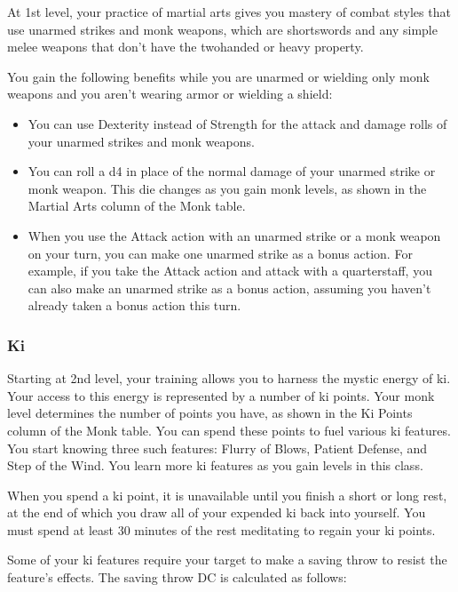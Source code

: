 \documentclass[
]{article}
\providecommand{\tightlist}{%
  \setlength{\itemsep}{0pt}\setlength{\parskip}{0pt}}
\begin{document}
At 1st level, your practice of martial arts gives you mastery of combat
styles that use unarmed strikes and monk weapons, which are shortswords
and any simple melee weapons that don't have the twohanded or heavy
property.

You gain the following benefits while you are unarmed or wielding only
monk weapons and you aren't wearing armor or wielding a shield:

\begin{itemize}
\tightlist
\item
  You can use Dexterity instead of Strength for the attack and damage
  rolls of your unarmed strikes and monk weapons.
\item
  You can roll a d4 in place of the normal damage of your unarmed strike
  or monk weapon. This die changes as you gain monk levels, as shown in
  the Martial Arts column of the Monk table.
\item
  When you use the Attack action with an unarmed strike or a monk weapon
  on your turn, you can make one unarmed strike as a bonus action. For
  example, if you take the Attack action and attack with a quarterstaff,
  you can also make an unarmed strike as a bonus action, assuming you
  haven't already taken a bonus action this turn.
\end{itemize}

\hypertarget{ki}{%
\subsubsection{Ki}\label{ki}}

Starting at 2nd level, your training allows you to harness the mystic
energy of ki. Your access to this energy is represented by a number of
ki points. Your monk level determines the number of points you have, as
shown in the Ki Points column of the Monk table. You can spend these
points to fuel various ki features. You start knowing three such
features: Flurry of Blows, Patient Defense, and Step of the Wind. You
learn more ki features as you gain levels in this class.

When you spend a ki point, it is unavailable until you finish a short or
long rest, at the end of which you draw all of your expended ki back
into yourself. You must spend at least 30 minutes of the rest meditating
to regain your ki points.

Some of your ki features require your target to make a saving throw to
resist the feature's effects. The saving throw DC is calculated as
follows:
\end{document}
